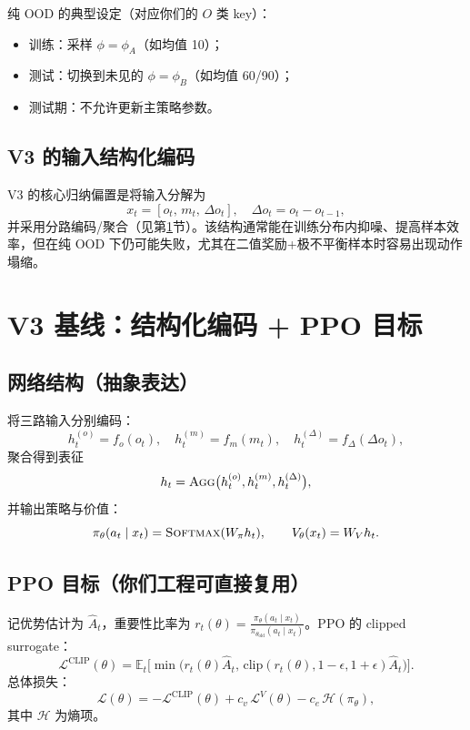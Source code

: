 \documentclass[UTF8,11pt,a4paper]{ctexart}
\begin{document}
纯 OOD 的典型设定（对应你们的 $O$ 类 key）：
\begin{itemize}
\item 训练：采样 $\phi=\phi_A$（如均值 10）；
\item 测试：切换到未见的 $\phi=\phi_B$（如均值 60/90）；
\item 测试期：不允许更新主策略参数。
\end{itemize}

\subsection{V3 的输入结构化编码}
V3 的核心归纳偏置是将输入分解为
\begin{equation}
 x_t = [o_t,\, m_t,\, \Delta o_t],\quad \Delta o_t=o_t-o_{t-1},
\end{equation}
并采用分路编码/聚合（见第\ref{sec:v3}节）。该结构通常能在训练分布内抑噪、提高样本效率，但在纯 OOD 下仍可能失败，尤其在二值奖励+极不平衡样本时容易出现动作塌缩。

\section{V3 基线：结构化编码 + PPO 目标}
\label{sec:v3}

\subsection{网络结构（抽象表达）}
将三路输入分别编码：
\begin{equation}
 h^{(o)}_t=f_o(o_t),\quad h^{(m)}_t=f_m(m_t),\quad h^{(\Delta)}_t=f_\Delta(\Delta o_t),
\end{equation}
聚合得到表征
\begin{equation}
 h_t = \textsc{Agg}\big(h^{(o)}_t, h^{(m)}_t, h^{(\Delta)}_t\big),
\end{equation}
并输出策略与价值：
\begin{equation}
 \pi_\theta(a_t\mid x_t)=\textsc{Softmax}(W_\pi h_t),\qquad V_\theta(x_t)=W_V h_t.
\end{equation}

\subsection{PPO 目标（你们工程可直接复用）}
记优势估计为 $\hat A_t$，重要性比率为 $r_t(\theta)=\frac{\pi_\theta(a_t\mid x_t)}{\pi_{\theta_{\mathrm{old}}}(a_t\mid x_t)}$。PPO 的 clipped surrogate：
\begin{equation}
\label{eq:ppo}
\mathcal{L}^{\mathrm{CLIP}}(\theta)=\mathbb{E}_t\Big[\min\big(r_t(\theta)\hat A_t,\, \mathrm{clip}(r_t(\theta),1-\epsilon,1+\epsilon)\hat A_t\big)\Big].
\end{equation}
总体损失：
\begin{equation}
\mathcal{L}(\theta)= -\mathcal{L}^{\mathrm{CLIP}}(\theta) + c_v\,\mathcal{L}^{V}(\theta) - c_e\,\mathcal{H}(\pi_\theta),
\end{equation}
其中 $\mathcal{H}$ 为熵项。
\end{document}

